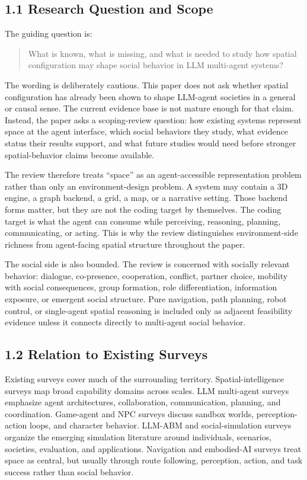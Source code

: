 \documentclass[
  twocolumn]{article}
\begin{document}
\subsection{1.1 Research Question and
Scope}\label{research-question-and-scope}

The guiding question is:

\begin{quote}
What is known, what is missing, and what is needed to study how spatial
configuration may shape social behavior in LLM multi-agent systems?
\end{quote}

The wording is deliberately cautious. This paper does not ask whether
spatial configuration has already been shown to shape LLM-agent
societies in a general or causal sense. The current evidence base is not
mature enough for that claim. Instead, the paper asks a scoping-review
question: how existing systems represent space at the agent interface,
which social behaviors they study, what evidence status their results
support, and what future studies would need before stronger
spatial-behavior claims become available.

The review therefore treats ``space'' as an agent-accessible
representation problem rather than only an environment-design problem. A
system may contain a 3D engine, a graph backend, a grid, a map, or a
narrative setting. Those backend forms matter, but they are not the
coding target by themselves. The coding target is what the agent can
consume while perceiving, reasoning, planning, communicating, or acting.
This is why the review distinguishes environment-side richness from
agent-facing spatial structure throughout the paper.

The social side is also bounded. The review is concerned with socially
relevant behavior: dialogue, co-presence, cooperation, conflict, partner
choice, mobility with social consequences, group formation, role
differentiation, information exposure, or emergent social structure.
Pure navigation, path planning, robot control, or single-agent spatial
reasoning is included only as adjacent feasibility evidence unless it
connects directly to multi-agent social behavior.

\subsection{1.2 Relation to Existing
Surveys}\label{relation-to-existing-surveys}

Existing surveys cover much of the surrounding territory.
Spatial-intelligence surveys map broad capability domains across scales.
LLM multi-agent surveys emphasize agent architectures, collaboration,
communication, planning, and coordination. Game-agent and NPC surveys
discuss sandbox worlds, perception-action loops, and character behavior.
LLM-ABM and social-simulation surveys organize the emerging simulation
literature around individuals, scenarios, societies, evaluation, and
applications. Navigation and embodied-AI surveys treat space as central,
but usually through route following, perception, action, and task
success rather than social behavior.
\end{document}
